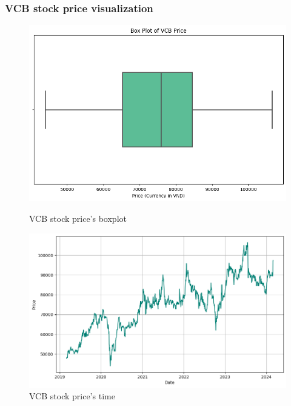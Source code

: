 \documentclass{ieeeojies}
\begin{document}
\subsubsection{VCB stock price visualization}
\begin{figure}[H]
    \centering
    \begin{minipage}{0.23\textwidth}
        \centering
        \includegraphics[width=1\textwidth]{bibliography/Figure/VCBboxplot.png}
        \caption{VCB stock price's boxplot}
        \label{fig:1}
    \end{minipage}
    \hfill
    \begin{minipage}{0.23\textwidth}
        \centering
        \includegraphics[width=1.1\textwidth]{bibliography/Figure/VCBtime.png}
        \caption{VCB stock price's time}
        \label{fig:2}
    \end{minipage}
    \begin{minipage}{0.23\textwidth}
        \centering

\end{minipage}
\end{figure}
\end{document}
